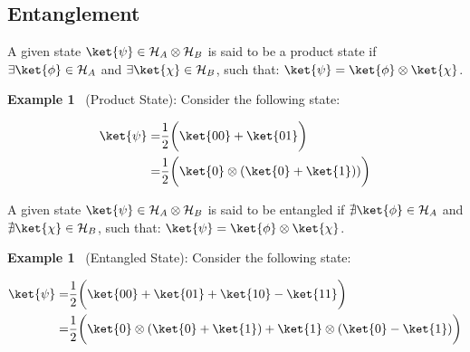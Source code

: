 \subsection{Entanglement}
\label{Subsection: Entanglement}

\begin{definition}
A given state $\ket{\psi} \in \mathcal{H}_A \otimes \mathcal{H}_B$ is said to be a product state if $\exists \ket{\phi} \in \mathcal{H}_A$ and $\exists \ket{\chi} \in \mathcal{H}_B$, such that: $\ket{\psi} = \ket{\phi} \otimes \ket{\chi}$.
\end{definition}

\textbf{Example 1} \ (Product State): Consider the following state:

\begin{equation}
    \begin{split}
    \ket{\psi} =  & \frac{1}{2}\bigg(\ket{00} + \ket{01} \bigg) \\
    = & \frac{1}{2}\bigg(\ket{0} \otimes(\ket{0} + \ket{1})) \bigg)
    \end{split}
\end{equation}

\begin{definition}
A given state $\ket{\psi} \in \mathcal{H}_A \otimes \mathcal{H}_B$ is said to be entangled if $\nexists \ket{\phi} \in \mathcal{H}_A$ and $\nexists \ket{\chi} \in \mathcal{H}_B$, such that: $\ket{\psi} = \ket{\phi} \otimes \ket{\chi}$.
\end{definition}

\textbf{Example 1} \ (Entangled State): Consider the following state:

\begin{equation}
    \begin{split}
    \ket{\psi} =  & \frac{1}{2}\bigg(\ket{00} + \ket{01} + \ket{10} - \ket{11} \bigg) \\
    = & \frac{1}{2}\bigg(\ket{0} \otimes(\ket{0} + \ket{1}) + \ket{1}\otimes(\ket{0} - \ket{1}) \bigg)
    \end{split}
\end{equation}
